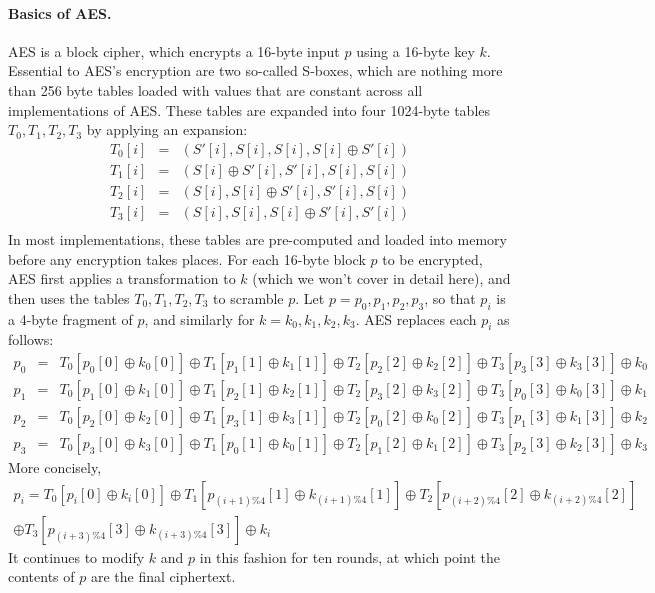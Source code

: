 \documentclass[11pt,twoside]{scrartcl}
\begin{document}
\paragraph{Basics of AES.} AES is a block cipher, which encrypts a 16-byte input $p$ using a 16-byte key $k$. Essential to AES's encryption are two so-called S-boxes, which are nothing more than 256 byte tables loaded with values that are constant across all implementations of AES. These tables are expanded into four 1024-byte tables $T_0, T_1, T_2, T_3$ by applying an expansion:
\[
\begin{array}{lcl}
%
T_0[i] & = & (S'[i], S[i], S[i], S[i] \oplus S'[i]) \\
T_1[i] & = & (S[i] \oplus S'[i], S'[i], S[i], S[i]) \\
T_2[i] & = & (S[i], S[i] \oplus S'[i], S'[i], S[i]) \\
T_3[i] & = & (S[i], S[i], S[i] \oplus S'[i], S'[i]) \\
\end{array}
\]
In most implementations, these tables are pre-computed and loaded into memory before any encryption takes places. For each 16-byte block $p$ to be encrypted, AES first applies a transformation to $k$ (which we won't cover in detail here), and then uses the tables $T_0, T_1, T_2, T_3$ to scramble $p$. Let $p = p_0, p_1, p_2, p_3$, so that $p_i$ is a 4-byte fragment of $p$, and similarly for $k = k_0, k_1, k_2, k_3$. AES replaces each $p_i$ as follows:
\[
\begin{array}{lcl}
%
p_0 & = & T_0[p_0[0] \oplus k_0[0]] \oplus T_1[p_1[1] \oplus k_1[1]] \oplus T_2[p_2[2] \oplus k_2[2]] \oplus T_3[p_3[3] \oplus k_3[3]] \oplus k_0 \\
p_1 & = & T_0[p_1[0] \oplus k_1[0]] \oplus T_1[p_2[1] \oplus k_2[1]] \oplus T_2[p_3[2] \oplus k_3[2]] \oplus T_3[p_0[3] \oplus k_0[3]] \oplus k_1 \\
p_2 & = & T_0[p_2[0] \oplus k_2[0]] \oplus T_1[p_3[1] \oplus k_3[1]] \oplus T_2[p_0[2] \oplus k_0[2]] \oplus T_3[p_1[3] \oplus k_1[3]] \oplus k_2 \\
p_3 & = & T_0[p_3[0] \oplus k_3[0]] \oplus T_1[p_0[1] \oplus k_0[1]] \oplus T_2[p_1[2] \oplus k_1[2]] \oplus T_3[p_2[3] \oplus k_2[3]] \oplus k_3
\end{array}
\]
More concisely,
\begin{multline*}
p_i = 
T_0[p_i[0] \oplus k_i[0]] 
\oplus T_1[p_{(i+1) \% 4}[1] \oplus k_{(i+1) \% 4}[1]]
\oplus T_2[p_{(i+2) \% 4}[2] \oplus k_{(i+2) \% 4}[2]]
\\
\oplus T_3[p_{(i+3) \% 4}[3] \oplus k_{(i+3) \% 4}[3]]
\oplus k_i
\end{multline*}
It continues to modify $k$ and $p$ in this fashion for ten rounds, at which point the contents of $p$ are the final ciphertext.
\end{document}
